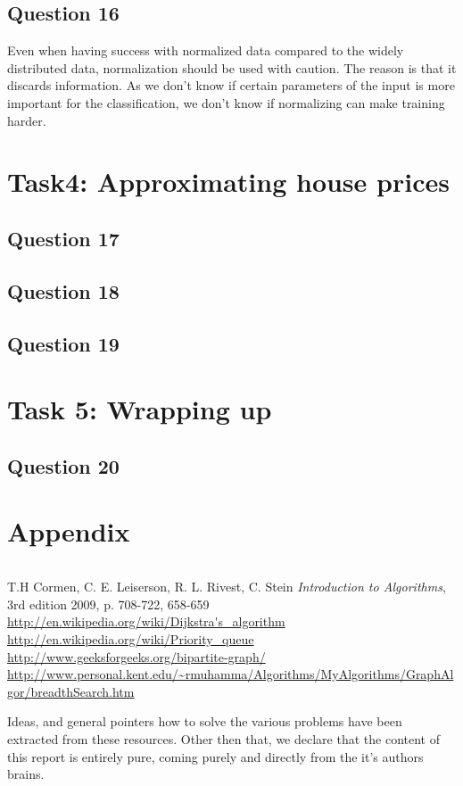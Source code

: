 \documentclass[a4paper]{article}
\begin{document}
\subsection*{Question 16}
Even when having success with normalized data compared to the widely distributed 
data, normalization should be used with caution. The reason is that it discards 
information. As we don't know if certain parameters of the input is more important 
for the classification, we don't know if normalizing can make training harder. 

\section{Task4: Approximating house prices}

\subsection*{Question 17}
\subsection*{Question 18}
\subsection*{Question 19}

\section{Task 5: Wrapping up}
\subsection*{Question 20}

\section{Appendix}

\begin{lstlisting}
\end{lstlisting}

\begin{thebibliography}{9}
		T.H Cormen, C. E. Leiserson, R. L. Rivest, C. Stein 	
				\textit{Introduction to Algorithms}, 3rd edition 2009, p. 708-722, 658-659 \\
		\url{http://en.wikipedia.org/wiki/Dijkstra's\_algorithm} \\
		\url{http://en.wikipedia.org/wiki/Priority\_queue} \\
		\url{http://www.geeksforgeeks.org/bipartite-graph/}
		\url{http://www.personal.kent.edu/~rmuhamma/Algorithms/MyAlgorithms/GraphAlgor/breadthSearch.htm}
\end{thebibliography}

Ideas, and general pointers how to solve the various problems have been extracted from these resources. Other then that, we declare that the content of this report is entirely pure, coming purely and directly from the it's authors brains.  
\end{document}
